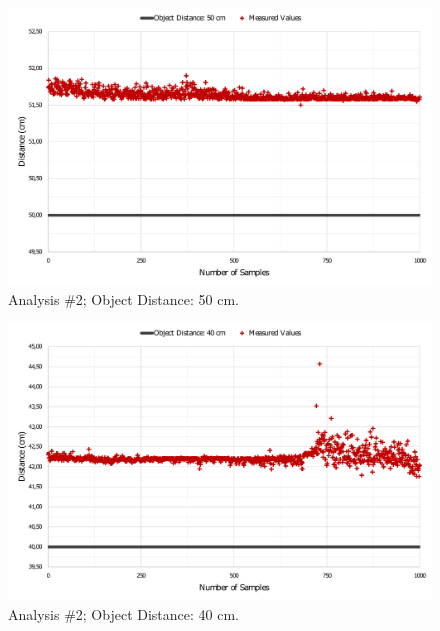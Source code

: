 \begin{figure}[h!]
    \centering
    \includegraphics[scale=0.52]{images/Results/testing_methodology/conf50.pdf}
    \caption{Analysis \#2; Object Distance: 50 cm.}
    \label{fig:conf50}
\end{figure}

\begin{figure}[h!]
    \centering
    \includegraphics[scale=0.52]{images/Results/testing_methodology/conf40.pdf}
    \caption{Analysis \#2; Object Distance: 40 cm.}
    \label{fig:conf40}
\end{figure}

